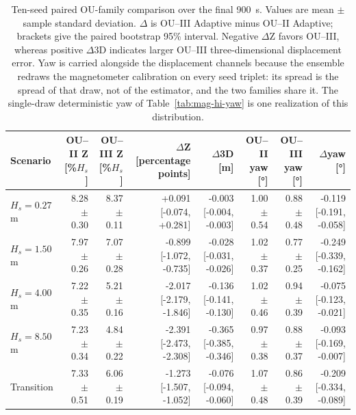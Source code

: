 
\begin{table}[t]
  \centering
  \caption{Ten-seed paired OU-family comparison over the final \SI{900}{s}. Values are mean $\pm$ sample standard deviation. $\Delta$ is OU--III Adaptive minus OU--II Adaptive; brackets give the paired bootstrap 95\% interval. Negative $\Delta$Z favors OU--III, whereas positive $\Delta$3D indicates larger OU--III three-dimensional displacement error. Yaw is carried alongside the displacement channels because the ensemble redraws the magnetometer calibration on every seed triplet: its spread is the spread of that draw, not of the estimator, and the two families share it. The single-draw deterministic yaw of Table~\ref{tab:mag-hi-yaw} is one realization of this distribution.}
  \label{tab:ou_mc_family}
  \footnotesize
  \setlength{\tabcolsep}{4.0pt}
  \begin{tabular}{@{}lrrrrrrr@{}}
    \toprule
    Scenario & OU--II Z [\%$H_s$] & OU--III Z [\%$H_s$] & $\Delta$Z [percentage points] & $\Delta$3D [m] & OU--II yaw [\si{\degree}] & OU--III yaw [\si{\degree}] & $\Delta$yaw [\si{\degree}] \\
    \midrule
    $H_s=0.27$ m & 8.28 $\pm$ 0.30 & 8.37 $\pm$ 0.11 & +0.091 [-0.074, +0.281] & -0.003 [-0.004, -0.003] & 1.00 $\pm$ 0.54 & 0.88 $\pm$ 0.48 & -0.119 [-0.191, -0.058] \\
    $H_s=1.50$ m & 7.97 $\pm$ 0.26 & 7.07 $\pm$ 0.28 & -0.899 [-1.072, -0.735] & -0.028 [-0.031, -0.026] & 1.02 $\pm$ 0.37 & 0.77 $\pm$ 0.25 & -0.249 [-0.339, -0.162] \\
    $H_s=4.00$ m & 7.22 $\pm$ 0.35 & 5.21 $\pm$ 0.16 & -2.017 [-2.179, -1.846] & -0.136 [-0.141, -0.130] & 1.02 $\pm$ 0.46 & 0.94 $\pm$ 0.39 & -0.075 [-0.123, -0.021] \\
    $H_s=8.50$ m & 7.23 $\pm$ 0.34 & 4.84 $\pm$ 0.22 & -2.391 [-2.473, -2.308] & -0.365 [-0.385, -0.346] & 0.97 $\pm$ 0.38 & 0.88 $\pm$ 0.37 & -0.093 [-0.169, -0.007] \\
    Transition & 7.33 $\pm$ 0.51 & 6.06 $\pm$ 0.19 & -1.273 [-1.507, -1.052] & -0.076 [-0.094, -0.060] & 1.07 $\pm$ 0.48 & 0.86 $\pm$ 0.39 & -0.209 [-0.334, -0.089] \\
    \bottomrule
  \end{tabular}
\end{table}

